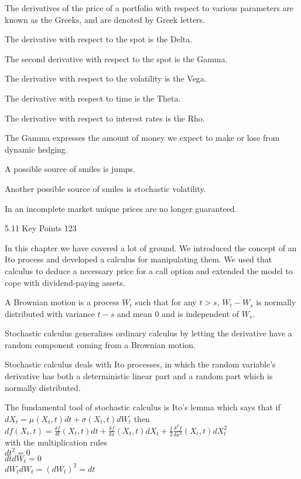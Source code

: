 The derivatives of the price of a portfolio with respect to various parameters are known as the Greeks, and are denoted by Greek letters.

The derivative with respect to the spot is the Delta.

The second derivative with respect to the spot is the Gamma.

The derivative with respect to the volatility is the Vega.

The derivative with respect to time is the Theta.

The derivative with respect to interest rates is the Rho.

The Gamma expresses the amount of money we expect to make or lose from dynamic hedging.

A possible source of smiles is jumps.

Another possible source of smiles is stochastic volatility.

In an incomplete market unique prices are no longer guaranteed.

5.11 Key Points 123

In this chapter we have covered a lot of ground. We introduced the concept of an Ito process and developed a calculus for manipulating them. We used that calculus to deduce a necessary price for a call option and extended the model to cope with dividend-paying assets.

A Brownian motion is a process $W_t$ such that for any $t>s$, $W_t-W_s$ is normally distributed with variance $t-s$ and mean $0$ and is independent of $W_s$.

Stochastic calculus generalizes ordinary calculus by letting the derivative have a random component coming from a Brownian motion.

Stochastic calculus deals with Ito processes, in which the random variable's derivative has both a deterministic linear part and a random part which is normally distributed.

The fundamental tool of stochastic calculus is Ito's lemma which says that if \\
$dX_t = \mu (X_t,t) dt + \sigma (X_t,t) d W_t$ then \\
$df(X_t ,t) = \frac{\delta f}{\delta t} (X_t,t) dt+\frac{\delta f}{\delta x}(X_t,t) dX_t + \frac{1}{2} \frac{\delta^2 f}{\delta x^2} (X_t,t) dX_t^2$ \\
with the multiplication rules \\
$dt^2=0$ \\
$dtdW_t =0$ \\
$dW_t dW_t = (dW_t)^2 =dt$

